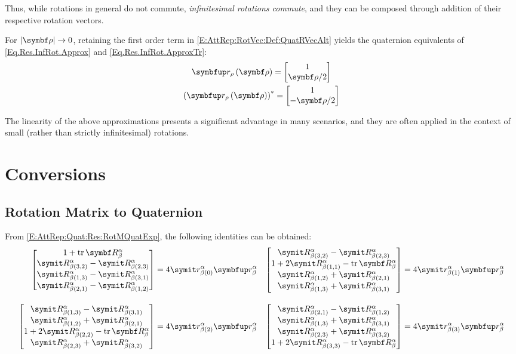 Thus, while rotations in general do not commute, \emph{infinitesimal rotations commute}, and they can be composed through addition of their respective rotation vectors.

For $|\mcol{\rotvecsymb}| \to 0$, retaining the first order term in \eqref{E:AttRep:RotVec:Def:QuatRVecAlt} yields the quaternion equivalents of \eqref{Eq.Res.InfRot.Approx} and \eqref{Eq.Res.InfRot.ApproxTr}:
\begin{gather}
	\RotQRotV{\mcol{\rotvecsymb}} = \qcol{1}{\mcol{\rotvecsymb} / 2} \label{Eq:AttRep:InfRot:Res:RotQRotV}\\
	\qconp{\RotQRotV{\mcol{\rotvecsymb}}} = \qcol{1}{-\mcol{\rotvecsymb} / 2}	
\end{gather}

The linearity of the above approximations presents a significant advantage in many scenarios, and they are often applied in the context of small (rather than strictly infinitesimal) rotations.


\section{Conversions}
\subsection{Rotation Matrix to Quaternion}
From \eqref{E:AttRep:Quat:Res:RotMQuatExp}, the following identities can be obtained:
\begin{align*}
	\qcolcmp
	{1 + \trace{\RotM{\alpha}{\beta}}}
	{\cRotM{\alpha}{\beta}{3,2} - \cRotM{\alpha}{\beta}{2,3}}
	{\cRotM{\alpha}{\beta}{1,3} - \cRotM{\alpha}{\beta}{3,1}}
	{\cRotM{\alpha}{\beta}{2,1} - \cRotM{\alpha}{\beta}{1,2}}
	&= 4 \cRotQ{\alpha}{\beta}{0} \RotQ{\alpha}{\beta}
	&
	\qcolcmp
	{\cRotM{\alpha}{\beta}{3,2} - \cRotM{\alpha}{\beta}{2,3}}
	{1 + 2 \cRotM{\alpha}{\beta}{1,1} - \trace{\RotM{\alpha}{\beta}}}
	{\cRotM{\alpha}{\beta}{1,2} + \cRotM{\alpha}{\beta}{2,1}}
	{\cRotM{\alpha}{\beta}{1,3} + \cRotM{\alpha}{\beta}{3,1}}
	&= 4\cRotQ{\alpha}{\beta}{1} \RotQ{\alpha}{\beta}
	\\[10pt]
	\qcolcmp
	{\cRotM{\alpha}{\beta}{1,3} - \cRotM{\alpha}{\beta}{3,1}}
	{\cRotM{\alpha}{\beta}{1,2} + \cRotM{\alpha}{\beta}{2,1}}
	{1 + 2 \cRotM{\alpha}{\beta}{2,2} - \trace{\RotM{\alpha}{\beta}}}
	{\cRotM{\alpha}{\beta}{2,3} + \cRotM{\alpha}{\beta}{3,2}}
	&= 4\cRotQ{\alpha}{\beta}{2} \RotQ{\alpha}{\beta}
	&
	\qcolcmp
	{\cRotM{\alpha}{\beta}{2,1} - \cRotM{\alpha}{\beta}{1,2}}
	{\cRotM{\alpha}{\beta}{1,3} + \cRotM{\alpha}{\beta}{3,1}}
	{\cRotM{\alpha}{\beta}{2,3} + \cRotM{\alpha}{\beta}{3,2}}
	{1 + 2 \cRotM{\alpha}{\beta}{3,3} - \trace{\RotM{\alpha}{\beta}}}
	&= 4\cRotQ{\alpha}{\beta}{3} \RotQ{\alpha}{\beta}
\end{align*}

